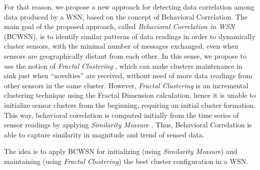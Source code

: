 \documentclass{acm_proc_article-sp}
\begin{document}
For that reason, we propose a new approach for detecting data correlation among
data produced by a WSN, based on the concept of Behavioral Correlation. The main
goal of the proposed approach, called  {\it Behavioral Correlation in WSN}
(BCWSN), is to identify similar patterns of data readings in order to
dynamically cluster sensors, with the minimal number of messages exchanged, even
when sensors are geographically distant from each other. In this sense, we
propose to use the notion of {\it Fractal Clustering} \cite{Barbara2000}, which
can make clusters maintenance in sink just when ``novelties'' are received,
without need of more data readings from other sensors in the same cluster.
However, {\it Fractal Clustering} is an incremental clustering technique using
the Fractal Dimension calculation, hence it is unable to initialize sensor
clusters from the beginning, requiring an initial cluster formation. This way,
behavioral correlation is computed initially from the time series of sensor
readings by applying {\it Similarity Measure} \cite{Liu2007}.
Thus, Behavioral Correlation is able to capture similarity in magnitude and
trend of sensed data.
\vspace*{-.3cm}


The idea is to apply BCWSN for initializing (using {\it Similarity Measure}) and
maintaining (using {\it Fractal Clustering}) the best cluster configuration in a
WSN.
\vspace*{-.3cm}

\end{document}
